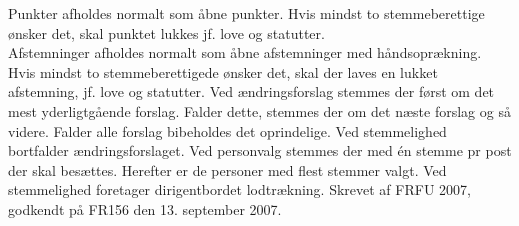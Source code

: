 Punkter afholdes normalt som åbne punkter. Hvis mindst to stemmeberettige ønsker det, skal punktet lukkes jf. love og
statutter.
\\
Afstemninger afholdes normalt som åbne afstemninger med håndsoprækning. Hvis mindst to stemmeberettigede ønsker
det, skal der laves en lukket afstemning, jf. love og statutter.
Ved ændringsforslag stemmes der først om det mest yderligtgående forslag. Falder dette, stemmes der om det næste
forslag og så videre. Falder alle forslag bibeholdes det oprindelige. Ved stemmelighed bortfalder ændringsforslaget.
Ved personvalg stemmes der med én stemme pr post der skal besættes. Herefter er de personer med flest stemmer valgt.
Ved stemmelighed foretager dirigentbordet lodtrækning.
Skrevet af FRFU 2007, godkendt på FR156 den 13. september 2007.
